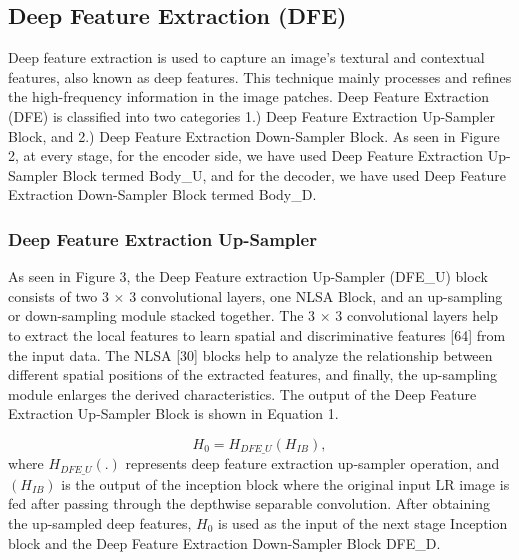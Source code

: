 \documentclass{ieeeaccess}
\begin{document}
\subsection{Deep Feature Extraction (DFE)}

Deep feature extraction is used to capture an image's textural and contextual features, also known as deep features. This technique mainly processes and refines the high-frequency information in the image patches. Deep Feature Extraction (DFE) is classified into two categories 1.) Deep Feature Extraction Up-Sampler Block, and 2.) Deep Feature Extraction Down-Sampler Block. As seen in Figure 2, at every stage, for the encoder side, we have used Deep Feature Extraction Up-Sampler Block termed Body\_U, and for the decoder, we have used Deep Feature Extraction Down-Sampler Block termed Body\_D.  

\subsubsection{ Deep Feature Extraction Up-Sampler}

As seen in Figure 3, the Deep Feature extraction Up-Sampler (DFE\_U) block consists of two 3 $\times$ 3 convolutional layers, one NLSA Block, and an up-sampling or down-sampling module stacked together. The 3 $\times$ 3 convolutional layers help to extract the local features to learn spatial and discriminative features [64] from the input data. The NLSA [30] blocks help to analyze the relationship between different spatial positions of the extracted features, and finally, the up-sampling module enlarges the derived characteristics. The output of the Deep Feature Extraction Up-Sampler Block is shown in Equation 1. 

\begin{equation}
{H_{0}}= {H_{DFE\_U}}({H_{IB}}),
\end{equation}
where ${H_{DFE\_U}}$$(.)$ represents deep feature extraction up-sampler operation, and $({H_{IB}})$ is the output of the inception block where the original input LR image is fed after passing through the depthwise separable convolution. After obtaining the up-sampled deep features, ${H_{0}}$ is used as the input of the next stage Inception block and the Deep Feature Extraction Down-Sampler Block DFE\_D.
\end{document}
